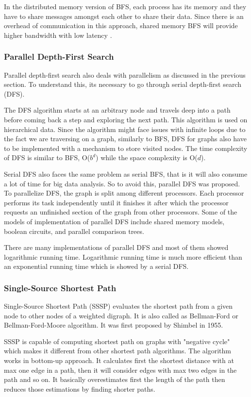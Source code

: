 \documentclass[journal,twoside,web]{ieeecolor}
\begin{document}
In the distributed memory version of BFS, each process has its memory and they have to share messages amongst each other to share their data. Since there is an overhead of communication in this approach, shared memory BFS will provide higher bandwidth with low latency \cite{37}.

\subsubsection{Parallel Depth-First Search}
Parallel depth-first search also deals with parallelism as discussed in the previous section. To understand this, its necessary to go through serial depth-first search (DFS).

The DFS algorithm starts at an arbitrary node and travels deep into a path before coming back a step and exploring the next path. This algorithm is used on hierarchical data. Since the algorithm might face issues with infinite loops due to the fact we are traversing on a graph, similarly to BFS, DFS for graphs also have to be implemented with a mechanism to store visited nodes. The time complexity of DFS is similar to BFS, O($b^d$) while the space complexity is O($d$).

Serial DFS also faces the same problem as serial BFS, that is it will also consume a lot of time for big data analysis. So to avoid this, parallel DFS was proposed. To parallelize DFS, the graph is split among different processors. Each processor performs its task independently until it finishes it after which the processor requests an unfinished section of the graph from other processors. Some of the models of implementation of parallel DFS include shared memory models, boolean circuits, and parallel comparison trees\cite{38}.  

There are many implementations of parallel DFS and most of them showed logarithmic running time\cite{38}. Logarithmic running time is much more efficient than an exponential running time which is showed by a serial DFS.

\subsubsection{Single-Source Shortest Path}
Single-Source Shortest Path (SSSP) evaluates the shortest path from a given node to other nodes of a weighted digraph. It is also called as Bellman-Ford or Bellman-Ford-Moore algorithm\cite{41}. It was first proposed by Shimbel\cite{42} in 1955.

SSSP is capable of computing shortest path on graphs with "negative cycle" which makes it different from other shortest path algorithms. The algorithm works in bottom-up approach. It calculates first the shortest distance with at max one edge in a path, then it will consider edges with max two edges in the path and so on. It basically overestimates first the length of the path then reduces those estimations by finding shorter paths. 
\end{document}

